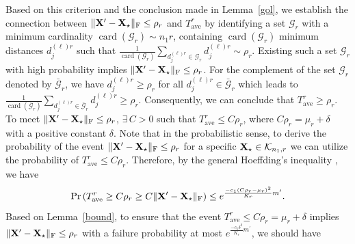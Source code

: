 \documentclass[12pt,draftcls,onecolumn]{IEEEtran}
\begin{document}
Based on this criterion and the conclusion made in Lemma~\ref{gol}, we establish the connection between
$\|\mathbf{X}^{\prime}-\mathbf{X}_{\star}\|_{\mathrm{F}}\leq\rho_r$ and $T_{\mathrm{ave}}^r$ by identifying
a set $\mathcal{G}_r$ with a minimum cardinality $\operatorname{card}(\mathcal{G}_r)\sim n_1r$, containing $\operatorname{card}(\mathcal{G}_r)$ minimum distances $d_j^{(\ell)r}$ such that $\frac{1}{\operatorname{card}(\mathcal{G}_r)}\sum_{d_j^{(\ell)r}\in\mathcal{G}_r}d_j^{(\ell)r}\sim\rho_r$. Existing such a set $\mathcal{G}_r$ with high probability implies $\|\mathbf{X}^{\prime}-\mathbf{X}_{\star}\|_{\mathrm{F}}\leq\rho_r$. For the complement of the set $\mathcal{G}_r$ denoted by $\bar{\mathcal{G}}_r$, we have $d_j^{(\ell)r}\geq\rho_r$ for all $d_j^{(\ell)r}\in\bar{\mathcal{G}}_r$ which leads to $\frac{1}{\operatorname{card}(\bar{\mathcal{G}}_r)}\sum_{d_j^{(\ell)r}\in\bar{\mathcal{G}}_r}d_j^{(\ell)r}\geq\rho_r$. Consequently, we can conclude that
$T_{\mathrm{ave}}^{r}\geq\rho_r$. To meet $\|\mathbf{X}^{\prime}-\mathbf{X}_{\star}\|_{\mathrm{F}}\leq\rho_r$, $\exists \, C>0$ such that $T_{\mathrm{ave}}^r\leq C\rho_r$, where $C\rho_r=\mu_r+\delta$ with a positive constant $\delta$. Note that in the probabilistic sense, to derive the probability of the event $\|\mathbf{X}^{\prime}-\mathbf{X}_{\star}\|_{\mathrm{F}}\leq\rho_r$ for a specific $\mathbf{X}_{\star}\in\mathcal{K}_{n_1,r}$ we can utilize
the probability of $T_{\mathrm{ave}}^r\leq C\rho_r$. Therefore, by the general Hoeffding's inequality \cite[Theorem~2.6.2]{vershynin2018high}, we have
\begin{equation}
\label{kvm_50}
\operatorname{Pr}\left(T_{\mathrm{ave}}^{r}\geq C\rho_r\geq C\|\mbX^{\prime}-\mbX_{\star}\|_{\mathrm{F}}\right)\leq e^{\frac{-c_1\left(C\rho_r-\mu_r\right)^{2}}{K_r}m^{\prime}}.
\end{equation}
Based on Lemma~\ref{bound}, to ensure that the event $T_{\mathrm{ave}}^r\leq C\rho_r=\mu_r+\delta$ implies $\|\mathbf{X}^{\prime}-\mathbf{X}_{\star}\|_{\mathrm{F}}\leq\rho_r$ with a failure probability at most $e^{\frac{-c_1\delta^2}{K_r}m^{\prime}}$, we should have
\end{document}
